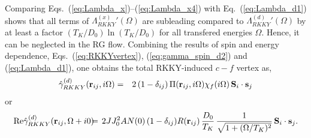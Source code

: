 \documentclass[12pt,twoside]{article}
\newcommand{\Eq}[1]{Eq.~(\ref{#1})}
\begin{document}
Comparing  Eqs.~(\ref{eq:Lambda_x})--(\ref{eq:Lambda_x4}) with
\Eq{eq:Lambda_d1} shows that all terms of $\Lambda^{(x)}_{RKKY}{'}(\Omega)$ 
are subleading compared to $\Lambda^{(d)}_{RKKY}{'}(\Omega)$ by at least 
a factor $(T_K/D_0)\ln(T_K/D_0)$ for all transfered energies $\Omega$.
Hence, it can be neglected in the RG flow. 
Combining the results of spin and energy dependence, 
Eqs.~(\ref{eq:RKKYvertex}), (\ref{eq:gamma_spin_d2}) and (\ref{eq:Lambda_d1}), 
one obtains the total RKKY-induced $c-f$ vertex as, 
\begin{eqnarray} 
\hat\gamma_{RKKY}^{(d)} ({\bf r}_{ij},i\Omega)&=&
2 \,(1-\delta_{ij})\,\Pi({\bf r}_{ij},i\Omega)\chi_f(i\Omega)\,{\bf S}_i
\cdot {\bf s}_j
\end{eqnarray}
or
\begin{eqnarray} 
{\rm Re}\hat\gamma_{RKKY}^{(d)} ({\bf r}_{ij},\Omega+i0)
\hspace*{-0.2cm}&=&\hspace*{-0.2cm}
2 JJ_0^2 AN(0)\,(1-\delta_{ij}) R({\bf r}_{ij}) \,
\frac{D_0}{T_K}\,\frac{1}{\sqrt{1+(\Omega/T_K)^2}} 
\,{\bf S}_i \cdot {\bf s}_j .
\end{eqnarray}










\clearpage
%




\end{document}
